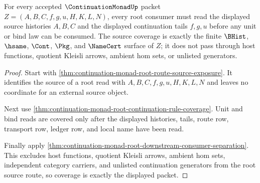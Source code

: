 \begin{theorem}
\label{thm:continuation-monad-root-source-coverage}
For every accepted $\ContinuationMonadUp$ packet $Z=(A,B,C,f,g,u,H,K,L,N)$, every root consumer must read the displayed source histories $A,B,C$ and the displayed continuation tails $f,g,u$ before any unit or bind law can be consumed. The source coverage is exactly the finite $\BHist$, $\hsame$, $\Cont$, $\Pkg$, and $\NameCert$ surface of $Z$; it does not pass through host functions, quotient Kleisli arrows, ambient hom sets, or unlisted generators.
\end{theorem}
\begin{proof}
Start with \autoref{thm:continuation-monad-root-route-source-exposure}. It identifies the source of a root read with $A,B,C,f,g,u,H,K,L,N$ and leaves no coordinate for an external source object.

Next use \autoref{thm:continuation-monad-root-continuation-rule-coverage}. Unit and bind reads are covered only after the displayed histories, tails, route row, transport row, ledger row, and local name have been read.

Finally apply \autoref{thm:continuation-monad-root-downstream-consumer-separation}. This excludes host functions, quotient Kleisli arrows, ambient hom sets, independent category carriers, and unlisted continuation generators from the root source route, so coverage is exactly the displayed packet.
\end{proof}

